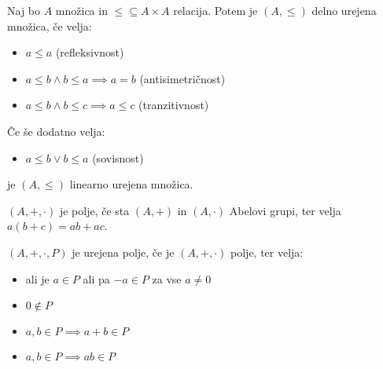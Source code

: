 \begin{definicija}
    Naj bo $A$ množica in $\leq \subseteq A \times A$ relacija.
    Potem je $(A, \leq)$ delno urejena množica, če velja:
    \begin{itemize}
        \item $a \leq a$ (refleksivnost)
        \item $a \leq b \wedge b \leq a \implies a = b$ (antisimetričnost)
        \item $a \leq b \wedge b \leq c \implies a \leq c$ (tranzitivnost)
    \end{itemize}
    Če še dodatno velja:
    \begin{itemize}
        \item $a \leq b \vee b \leq a$ (sovisnost)
    \end{itemize}
    je $(A, \leq)$ linearno urejena množica.
\end{definicija}

\begin{definicija}
    $(A, +, \cdot)$ je polje, če sta $(A, +)$ in $(A, \cdot)$ Abelovi grupi, ter velja $a(b + c) = ab + ac$.
\end{definicija}

\begin{definicija}
    $(A, +, \cdot, P)$ je urejena polje, če je $(A, +, \cdot)$ polje, ter velja:
    \begin{itemize}
        \item ali je $a \in P$ ali pa $-a \in P$ za vse $a \neq 0$
        \item $0 \notin P$
        \item $a, b \in P \implies a + b \in P$
        \item $a, b \in P \implies ab \in P$
    \end{itemize}
\end{definicija}
